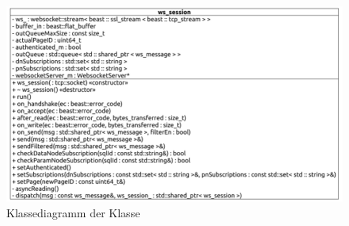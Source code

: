 \begin{figure}[ht]
  \centering
  \includegraphics[width=\textwidth]{content/hauptteil/umsetzungPoC/backend/uml/classesOfOverview/ws_session.pdf}
  \caption{Klassediagramm der Klasse }
  \label{fig:backend:classDiag:wsSession}
\end{figure}